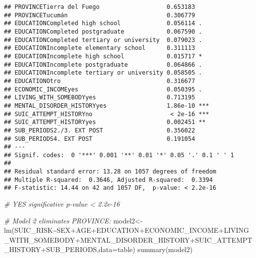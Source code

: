 \documentclass[
]{book}
\newenvironment{Shaded}{\begin{snugshade}}{\end{snugshade}}
\newcommand{\AttributeTok}[1]{\textcolor[rgb]{0.77,0.63,0.00}{#1}}
\newcommand{\CommentTok}[1]{\textcolor[rgb]{0.56,0.35,0.01}{\textit{#1}}}
\newcommand{\FunctionTok}[1]{\textcolor[rgb]{0.00,0.00,0.00}{#1}}
\newcommand{\NormalTok}[1]{#1}
\newcommand{\OtherTok}[1]{\textcolor[rgb]{0.56,0.35,0.01}{#1}}
\newcommand{\SpecialCharTok}[1]{\textcolor[rgb]{0.00,0.00,0.00}{#1}}
\begin{document}
\begin{verbatim}
## PROVINCETierra del Fuego                   0.653183    
## PROVINCETucumán                            0.306779    
## EDUCATIONCompleted high school             0.056114 .  
## EDUCATIONCompleted postgraduate            0.067590 .  
## EDUCATIONCompleted tertiary or university  0.079023 .  
## EDUCATIONIncomplete elementary school      0.311113    
## EDUCATIONIncomplete high school            0.015717 *  
## EDUCATIONIncomplete postgraduate           0.064866 .  
## EDUCATIONIncomplete tertiary or university 0.058505 .  
## EDUCATIONOtro                              0.316677    
## ECONOMIC_INCOMEyes                         0.050395 .  
## LIVING_WITH_SOMEBODYyes                    0.713195    
## MENTAL_DISORDER_HISTORYyes                 1.86e-10 ***
## SUIC_ATTEMPT_HISTORYno                      < 2e-16 ***
## SUIC_ATTEMPT_HISTORYyes                    0.002451 ** 
## SUB_PERIODS2./3. EXT POST                  0.356022    
## SUB_PERIODS4. EXT POST                     0.191054    
## ---
## Signif. codes:  0 '***' 0.001 '**' 0.01 '*' 0.05 '.' 0.1 ' ' 1
## 
## Residual standard error: 13.28 on 1057 degrees of freedom
## Multiple R-squared:  0.3646, Adjusted R-squared:  0.3394 
## F-statistic: 14.44 on 42 and 1057 DF,  p-value: < 2.2e-16
\end{verbatim}

\begin{Shaded}
\begin{Highlighting}[]
\CommentTok{\# YES significative p{-}value \textless{} 2.2e{-}16}

\CommentTok{\# Model 2 eliminates PROVINCE:}
\NormalTok{model2}\OtherTok{\textless{}{-}}\FunctionTok{lm}\NormalTok{(SUIC\_RISK}\SpecialCharTok{\textasciitilde{}}\NormalTok{SEX}\SpecialCharTok{+}\NormalTok{AGE}\SpecialCharTok{+}\NormalTok{EDUCATION}\SpecialCharTok{+}\NormalTok{ECONOMIC\_INCOME}\SpecialCharTok{+}\NormalTok{LIVING\_WITH\_SOMEBODY}\SpecialCharTok{+}\NormalTok{MENTAL\_DISORDER\_HISTORY}\SpecialCharTok{+}\NormalTok{SUIC\_ATTEMPT\_HISTORY}\SpecialCharTok{+}\NormalTok{SUB\_PERIODS,}\AttributeTok{data=}\NormalTok{table)}
\FunctionTok{summary}\NormalTok{(model2)}
\end{Highlighting}
\end{Shaded}
\end{document}
